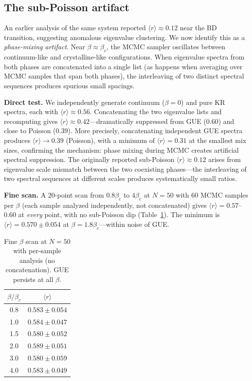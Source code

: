 \documentclass[aps,prd,twocolumn,superscriptaddress,nofootinbib]{revtex4-2}
\begin{document}
\subsection{The sub-Poisson artifact}

An earlier analysis of the same system reported $\langle r \rangle \approx 0.12$ near the BD transition, suggesting anomalous eigenvalue clustering. We now identify this as a \emph{phase-mixing artifact}. Near $\beta \approx \beta_c$, the MCMC sampler oscillates between continuum-like and crystalline-like configurations. When eigenvalue spectra from both phases are concatenated into a single list (as happens when averaging over MCMC samples that span both phases), the interleaving of two distinct spectral sequences produces spurious small spacings.

\textbf{Direct test.} We independently generate continuum ($\beta = 0$) and pure KR spectra, each with $\langle r \rangle \approx 0.56$. Concatenating the two eigenvalue lists and recomputing gives $\langle r \rangle \approx 0.42$---dramatically suppressed from GUE ($0.60$) and close to Poisson ($0.39$). More precisely, concatenating independent GUE spectra produces $\langle r \rangle \to 0.39$ (Poisson), with a minimum of $\langle r \rangle = 0.31$ at the smallest mix sizes, confirming the mechanism: phase mixing during MCMC creates artificial spectral suppression. The originally reported sub-Poisson $\langle r \rangle \approx 0.12$ arises from eigenvalue scale mismatch between the two coexisting phases---the interleaving of two spectral sequences at different scales produces systematically small ratios.

\textbf{Fine scan.} A 20-point scan from $0.8\beta_c$ to $4\beta_c$ at $N = 50$ with 60 MCMC samples per $\beta$ (each sample analyzed independently, not concatenated) gives $\langle r \rangle = 0.57$--$0.60$ at \emph{every} point, with no sub-Poisson dip (Table~\ref{tab:fine}). The minimum is $\langle r \rangle = 0.570 \pm 0.054$ at $\beta = 1.8\beta_c$---within noise of GUE.

\begin{table}[h]
\centering
\begin{tabular}{cc}
\toprule
$\beta / \beta_c$ & $\langle r \rangle$ \\
\midrule
0.8 & $0.583 \pm 0.054$ \\
1.0 & $0.584 \pm 0.047$ \\
1.5 & $0.580 \pm 0.052$ \\
2.0 & $0.589 \pm 0.051$ \\
3.0 & $0.580 \pm 0.059$ \\
4.0 & $0.583 \pm 0.049$ \\
\bottomrule
\end{tabular}
\caption{Fine $\beta$ scan at $N = 50$ with per-sample analysis (no concatenation). GUE persists at all $\beta$.}
\label{tab:fine}
\end{table}
\end{document}
